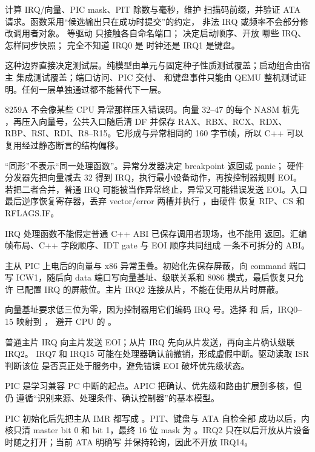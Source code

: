  计算 IRQ/向量、PIC mask、PIT 除数与毫秒，维护
扫描码前缀，并验证 ATA 请求。函数采用“候选输出只在成功时提交”的约定，
非法 IRQ 或频率不会部分修改调用者对象。 等驱动
只接触各自命名端口； 决定启动顺序、开放
哪些 IRQ、怎样同步快照； 完全不知道 IRQ0 是
时钟还是 IRQ1 是键盘。

这种边界直接决定测试层。纯模型由单元与固定种子性质测试覆盖；启动组合由宿主
集成测试覆盖；端口访问、PIC 交付、 和键盘事件只能由 QEMU
整机测试证明。任何一层单独通过都不能替代下一层。

8259A 不会像某些 CPU 异常那样压入错误码。向量 32--47 的每个 NASM 桩先
，再压入向量号，公共入口随后清 DF 并保存
RAX、RBX、RCX、RDX、RBP、RSI、RDI、R8--R15。它形成与异常相同的
160 字节帧，所以 C++ 可以复用经过静态断言的结构偏移。

“同形”不表示“同一处理函数”。异常分发器决定 breakpoint 返回或 panic；
硬件分发器先把向量减去 32 得到 IRQ，执行最小设备动作，再按控制器规则 EOI。
若把二者合并，普通 IRQ 可能被当作异常终止，异常又可能错误发送 EOI。入口
最后逆序恢复寄存器，丢弃 vector/error 两槽并执行 ，由硬件
恢复 RIP、CS 和 RFLAGS.IF。

\begin{contractbox}
IRQ 处理函数不能假定普通 C++ ABI 已保存调用者现场，也不能用
 返回。汇编帧布局、C++ 字段顺序、IDT gate 与 EOI 顺序共同组成
一条不可拆分的 ABI。
\end{contractbox}

主从 PIC 上电后的向量与 x86 异常重叠。初始化先保存屏蔽，向 command 端口
写 ICW1，随后向 data 端口写向量基址、级联关系和 8086 模式，最后恢复只允许
已配置 IRQ 的屏蔽位。主片 IRQ2 连接从片，不能在使用从片时屏蔽。

向量基址要求低三位为零，因为控制器用它们编码 IRQ 号。选择
 和  后，IRQ0--15 映射到 ，
避开 CPU 的 。

普通主片 IRQ 向主片发送 EOI；从片 IRQ 先向从片发送，再向主片确认级联 IRQ2。
IRQ7 和 IRQ15 可能在处理器确认前撤销，形成虚假中断。驱动读取 ISR 判断该位
是否真正处于服务中，避免错误 EOI 破坏优先级状态。

PIC 是学习兼容 PC 中断的起点。APIC 把确认、优先级和路由扩展到多核，但仍
遵循“识别来源、处理条件、确认控制器”的基本模型。

PIC 初始化后先把主从 IMR 都写成 。PIT、键盘与 ATA 自检全部
成功以后，内核只清 master bit 0 和 bit 1，最终 16 位 mask 为
。IRQ2 只在以后开放从片设备时随之打开；当前 ATA 明确写
 并保持轮询，因此不开放 IRQ14。

